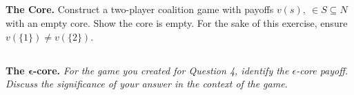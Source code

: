 \documentclass[12pt]{amsart}
\begin{document}
\subsection{}
\textbf{The Core.} 
Construct a two-player coalition game with payoffs $v(s),\ \in S \subseteq N$ with an empty core. Show the core is empty. For the sake of this exercise, ensure $v(\{1\}) \neq v(\{2\})$.

\subsection{}
\textbf{The $\boldsymbol\epsilon$-core.} 
\textit{For the game you created for Question 4, identify the $\epsilon$-core payoff. Discuss the significance of your answer in the context of the game.}
\end{document}
